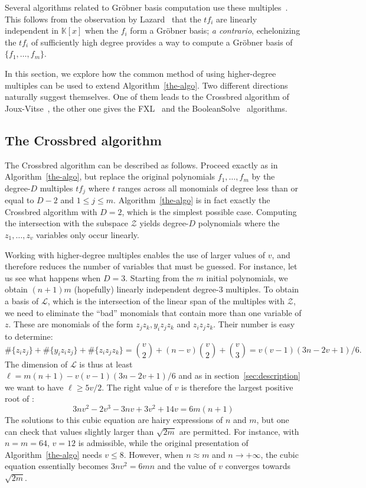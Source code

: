 \documentclass[twoside,leqno]{article}
\begin{document}
Several algorithms related to Gröbner basis computation use these
multiples~\cite{F4,F5,CourtoisKPS00,BardetFSS13,JouxV17}. This follows from the
observation by Lazard~\cite{Lazard83} that the $t f_i$ are linearly independent
in $\mathbb{K}[x]$ when the $f_i$ form a Gröbner basis; \textit{a contrario},
echelonizing the $t f_i$ of sufficiently high degree provides a way to compute a
Gröbner basis of $\{f_1, \dots, f_m\}$.

In this section, we explore how the common method of using higher-degree
multiples can be used to extend Algorithm~\ref{the-algo}. Two different
directions naturally suggest themselves. One of them leads to the
\textsf{Crossbred} algorithm of Joux-Vitse~\cite{JouxV17}, the other one gives
the \textsf{FXL}~\cite{CourtoisKPS00} and the
\textsf{BooleanSolve}~\cite{BardetFSS13} algorithms.

\subsection{The \textsf{Crossbred} algorithm}
\label{sec:JV}

The \textsf{Crossbred} algorithm can be described as follows. Proceed exactly as
in Algorithm~\ref{the-algo}, but replace the original polynomials
$f_1, \dots, f_m$ by the degree-$D$ multiples $t f_j$ where $t$ ranges across
all monomials of degree less than or equal to $D-2$ and $1 \leq j \leq
m$. Algorithm~\ref{the-algo} is in fact exactly the \textsf{Crossbred} algorithm
with $D=2$, which is the simplest possible case. Computing the intersection with
the subspace $\mathcal{Z}$ yields degree-$D$ polynomials where the
$z_1, \dots, z_v$ variables only occur linearly.

Working with higher-degree multiples enables the use of larger values of $v$,
and therefore reduces the number of variables that must be guessed. For
instance, let us see what happens when $D=3$. Starting from the $m$ initial
polynomials, we obtain $(n+1)m$ (hopefully) linearly independent degree-3
multiples. To obtain a basis of $\mathcal{L}$, which is the intersection of the
linear span of the multiples with $\mathcal{Z}$, we need to eliminate the
``bad'' monomials that contain more than one variable of $z$. These are
monomials of the form $z_jz_k, y_iz_jz_k$ and $z_iz_jz_k$. Their number is easy
to determine:
\[
  \#\{z_iz_j\} + \#\{y_iz_iz_j\} +\#\{z_iz_jz_k\} = \binom{v}{2} + (n-v)\binom{v}{2} +\binom{v}{3} = v(v - 1)(3n - 2v + 1) / 6.
\]
The dimension of $\mathcal{L}$ is thus at least
$\ell = m(n+1) - v(v - 1)(3n - 2v + 1) / 6$ and as in
section~\ref{sec:description} we want to have $\ell \geq 5v/2$. The right value
of $v$ is therefore the largest positive root of  :
\[
3nv^2 - 2v^3 - 3nv + 3v^2 + 14v = 6m(n+1)
\]
The solutions to this cubic equation are hairy expressions of $n$ and $m$, but
one can check that values slightly larger than $\sqrt{2m}$ are permitted. For
instance, with $n=m=64$, $v=12$ is admissible, while the original presentation
of Algorithm~\ref{the-algo} needs $v \leq 8$. However, when $n \approx m$ and
$n \rightarrow +\infty$, the cubic equation essentially becomes $3nv^2 = 6mn$
and the value of $v$ converges towards $\sqrt{2m}$.
\end{document}
